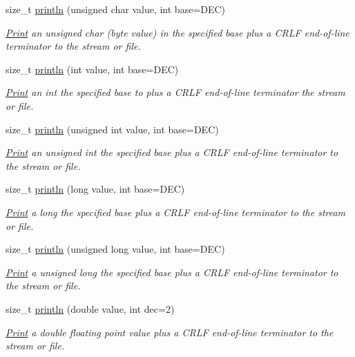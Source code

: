\begin{DoxyCompactItemize}
size\+\_\+t \mbox{\hyperlink{class_print_a000b3fd5b723cb6c7db0d3231a9ef2f8}{println}} (unsigned char value, int base=D\+EC)
\begin{DoxyCompactList}\small\item\em \mbox{\hyperlink{class_print}{Print}} an unsigned char (byte value) in the specified base plus a C\+R\+LF end-\/of-\/line terminator to the stream or file. \end{DoxyCompactList}\item 
size\+\_\+t \mbox{\hyperlink{class_print_a82aa91bbd859f28a0a3b4869e5bfcadd}{println}} (int value, int base=D\+EC)
\begin{DoxyCompactList}\small\item\em \mbox{\hyperlink{class_print}{Print}} an int the specified base to plus a C\+R\+LF end-\/of-\/line terminator the stream or file. \end{DoxyCompactList}\item 
size\+\_\+t \mbox{\hyperlink{class_print_a2608232c1f10f654111ff447de16d60b}{println}} (unsigned int value, int base=D\+EC)
\begin{DoxyCompactList}\small\item\em \mbox{\hyperlink{class_print}{Print}} an unsigned int the specified base plus a C\+R\+LF end-\/of-\/line terminator to the stream or file. \end{DoxyCompactList}\item 
size\+\_\+t \mbox{\hyperlink{class_print_a82bbe59b28440c29e55ff3597eb45376}{println}} (long value, int base=D\+EC)
\begin{DoxyCompactList}\small\item\em \mbox{\hyperlink{class_print}{Print}} a long the specified base plus a C\+R\+LF end-\/of-\/line terminator to the stream or file. \end{DoxyCompactList}\item 
size\+\_\+t \mbox{\hyperlink{class_print_afa936d7e8dd329d9162f2cd28f42681e}{println}} (unsigned long value, int base=D\+EC)
\begin{DoxyCompactList}\small\item\em \mbox{\hyperlink{class_print}{Print}} a unsigned long the specified base plus a C\+R\+LF end-\/of-\/line terminator to the stream or file. \end{DoxyCompactList}\item 
size\+\_\+t \mbox{\hyperlink{class_print_a178b90baf9f74f0945f5c64aafec59ea}{println}} (double value, int dec=2)
\begin{DoxyCompactList}\small\item\em \mbox{\hyperlink{class_print}{Print}} a double floating point value plus a C\+R\+LF end-\/of-\/line terminator to the stream or file. \end{DoxyCompactList}\item 

\end{DoxyCompactItemize}
